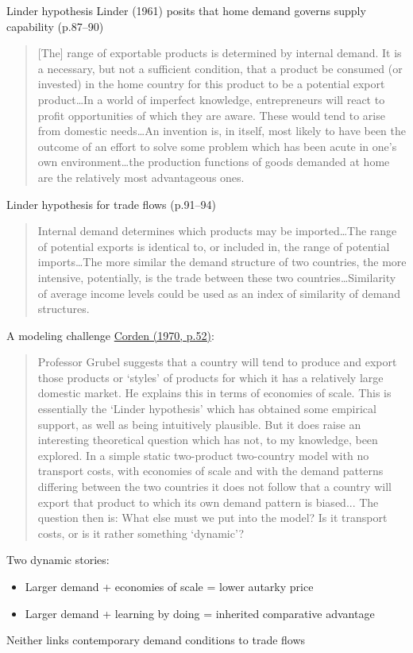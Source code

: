 \documentclass[10pt,notes=hide]{beamer}
\begin{document}
\begin{frame}{Linder hypothesis}
\linespread{0.95}
Linder (1961) posits that home demand governs supply capability (p.87--90)
\begin{quote}{\footnotesize
[The] range of exportable products is determined by internal demand. It is a necessary, but not a sufficient condition, that a product be consumed (or invested) in the home country for this product to be a potential export product\dots In a world of imperfect knowledge, entrepreneurs will react to profit opportunities of which they are aware. These would tend to arise from domestic needs\dots An invention is, in itself, most likely to have been the outcome of an effort to solve some problem which has been acute in one's own environment\dots the production functions of goods demanded at home are the relatively most advantageous ones.
}\end{quote}
Linder hypothesis for trade flows (p.91--94)
\begin{quote}{\small
Internal demand determines which products may be imported\dots The range of potential exports is identical to, or included in, the range of potential imports\dots The more similar the demand structure of two countries, the more intensive, potentially, is the trade between these two countries\dots Similarity of average income levels could be used as an index of similarity of demand structures.
}\end{quote}
\end{frame}
\begin{frame}{A modeling challenge}
\linespread{0.95}
\href{http://tradediversion.net/2013/10/11/a-prescient-note-on-the-home-market-effect-by-max-corden/}{Corden (1970, p.52)}:
\begin{quote}
{\small
Professor Grubel suggests that a country will tend to produce and export those products or `styles' of products for which it has a relatively large domestic market. He explains this in terms of economies of scale. This is essentially the `Linder hypothesis' which has obtained some empirical support, as well as being intuitively plausible. But it does raise an interesting theoretical question which has not, to my knowledge, been explored. In a simple static two-product two-country model with no transport costs, with economies of scale and with the demand patterns differing between the two countries it does not follow that a country will export that product to which its own demand pattern is biased... The question then is: What else must we put into the model? Is it transport costs, or is it rather something `dynamic'?
}
\end{quote}
Two dynamic stories:
\begin{itemize}
	\item Larger demand + economies of scale = lower autarky price
	\item Larger demand + learning by doing = inherited comparative advantage
\end{itemize}
Neither links contemporary demand conditions to trade flows
\end{frame}
\end{document}
